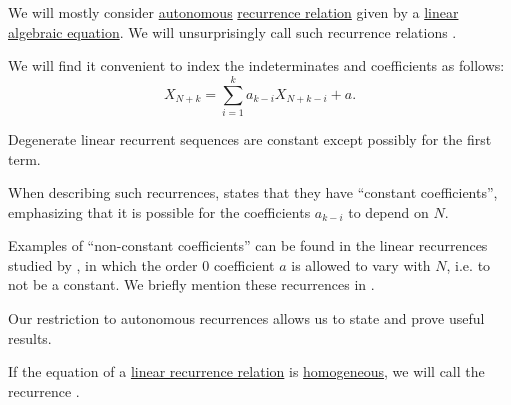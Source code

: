 \begin{definition}\label{def:linear_recurrence}
  We will mostly consider \hyperref[def:recurrence_relation/autonomous]{autonomous} \hyperref[def:recurrence_relation]{recurrence relation} given by a \hyperref[def:polynomial_degree_terminology]{linear} \hyperref[def:algebraic_equation]{algebraic equation}. We will unsurprisingly call such recurrence relations .

  We will find it convenient to index the indeterminates and coefficients as follows:
  \begin{equation}\label{eq:def:linear_recurrence}
    X_{N+k} = \sum_{i=1}^k a_{k-i} X_{N+k-i} + a.
  \end{equation}
\end{definition}
\begin{comments}
  \item Degenerate linear recurrent sequences are constant except possibly for the first term.
  \item When describing such recurrences,  states that they have \enquote{constant coefficients}, emphasizing that it is possible for the coefficients \( a_{k-i} \) to depend on \( N \).

  Examples of \enquote{non-constant coefficients} can be found in the linear recurrences studied by , in which the order \( 0 \) coefficient \( a \) is allowed to vary with \( N \), i.e. to not be a constant. We briefly mention these recurrences in .

  Our restriction to autonomous recurrences allows us to state and prove useful results.
\end{comments}

\begin{definition}\label{def:homogeneous_linear_recurrence}
  If the equation of a \hyperref[def:linear_recurrence]{linear recurrence relation} is \hyperref[def:homogeneous_equation]{homogeneous}, we will call the recurrence .
\end{definition}

